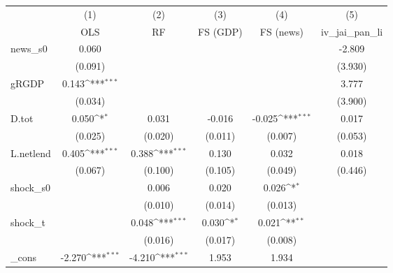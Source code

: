 {
\def\sym#1{\ifmmode^{#1}\else\(^{#1}\)\fi}
\begin{tabular}{l*{5}{c}}
\toprule
            &\multicolumn{1}{c}{(1)}&\multicolumn{1}{c}{(2)}&\multicolumn{1}{c}{(3)}&\multicolumn{1}{c}{(4)}&\multicolumn{1}{c}{(5)}\\
            &\multicolumn{1}{c}{OLS}&\multicolumn{1}{c}{RF}&\multicolumn{1}{c}{FS (GDP)}&\multicolumn{1}{c}{FS (news)}&\multicolumn{1}{c}{iv\_jai\_pan\_li}\\
\midrule
news\_s0     &       0.060         &                     &                     &                     &      -2.809         \\
            &     (0.091)         &                     &                     &                     &     (3.930)         \\
\addlinespace
gRGDP       &       0.143\sym{***}&                     &                     &                     &       3.777         \\
            &     (0.034)         &                     &                     &                     &     (3.900)         \\
\addlinespace
D.tot       &       0.050\sym{*}  &       0.031         &      -0.016         &      -0.025\sym{***}&       0.017         \\
            &     (0.025)         &     (0.020)         &     (0.011)         &     (0.007)         &     (0.053)         \\
\addlinespace
L.netlend   &       0.405\sym{***}&       0.388\sym{***}&       0.130         &       0.032         &       0.018         \\
            &     (0.067)         &     (0.100)         &     (0.105)         &     (0.049)         &     (0.446)         \\
\addlinespace
shock\_s0    &                     &       0.006         &       0.020         &       0.026\sym{*}  &                     \\
            &                     &     (0.010)         &     (0.014)         &     (0.013)         &                     \\
\addlinespace
shock\_t     &                     &       0.048\sym{***}&       0.030\sym{*}  &       0.021\sym{**} &                     \\
            &                     &     (0.016)         &     (0.017)         &     (0.008)         &                     \\
\addlinespace
\_cons      &      -2.270\sym{***}&      -4.210\sym{***}&       1.953         &       1.934         &                     \\

\end{tabular}}
